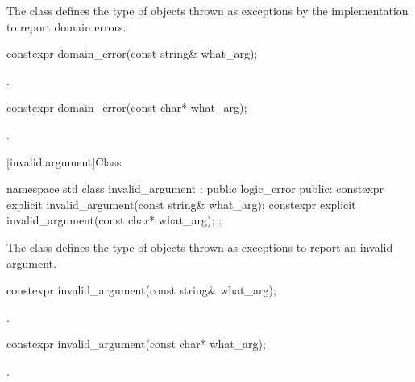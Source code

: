 \pnum
The class
defines the type of objects thrown as
exceptions by the implementation to report domain errors.

%
\begin{itemdecl}
constexpr domain_error(const string& what_arg);
\end{itemdecl}

\begin{itemdescr}
\pnum
\ensures
{}.
\end{itemdescr}

%
\begin{itemdecl}
constexpr domain_error(const char* what_arg);
\end{itemdecl}

\begin{itemdescr}
\pnum
\ensures
{}.
\end{itemdescr}

[invalid.argument]{Class }

%
\begin{codeblock}
namespace std {
  class invalid_argument : public logic_error {
  public:
    constexpr explicit invalid_argument(const string& what_arg);
    constexpr explicit invalid_argument(const char* what_arg);
  };
}
\end{codeblock}

\pnum
The class
defines the type of objects thrown as exceptions to report an invalid argument.

%
\begin{itemdecl}
constexpr invalid_argument(const string& what_arg);
\end{itemdecl}

\begin{itemdescr}
\pnum
\ensures
{}.
\end{itemdescr}

%
\begin{itemdecl}
constexpr invalid_argument(const char* what_arg);
\end{itemdecl}

\begin{itemdescr}
\pnum
\ensures
{}.
\end{itemdescr}

